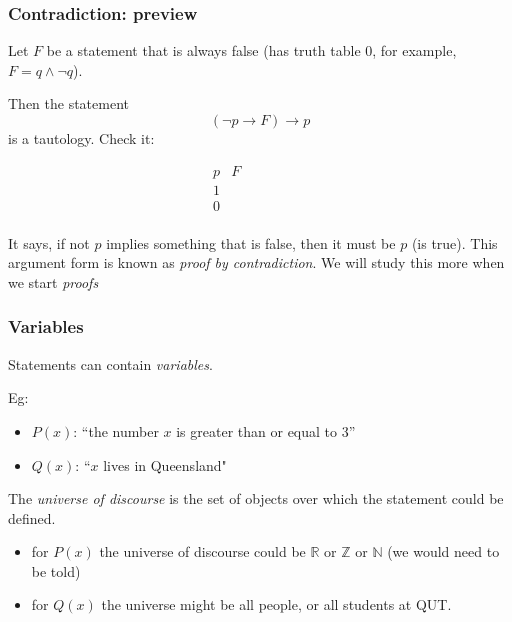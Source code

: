 \documentclass[10pt]{beamer}
\newcommand{\ra}{\to} %
\theoremstyle{definition}
\newcommand{\N}{\ensuremath{\mathbb{N}}}
\newcommand{\Z}{\ensuremath{\mathbb{Z}}}
\newcommand{\R}{\ensuremath{\mathbb{R}}}
\begin{document}
\begin{frame}
\frametitle{Contradiction: preview }
Let $F$ be a statement that is always false (has truth table 0, for example, $F=q\wedge \neg q$). 

\bigskip
Then the statement  $$(\neg p\ra F)\ra p$$ is a tautology. Check it:

\[
\begin{array}{c|c|ccc}
 p & F &   \ \ \ \ \ \ \ \ \ \ \ \ \ \ \ \ \ \ \\
 \hline
 1 & &  \\
 0&   & \\
\end{array}\]



\vspace{5mm}
\pause 
It says, if not $p$ implies something that is false, then it must be $p$ (is true). 
This  argument  form is known as {\em proof by contradiction}. We will study this more when we start {\em proofs}



\vspace{2cm}
\vfill
\end{frame}




\begin{frame}
\frametitle{Variables }

Statements can  contain {\em variables}.

\bigskip
Eg:\begin{itemize}\item 
 $P(x)$: ``the number $x$ is greater than or equal to 3'' \item 
$Q(x)$: ``$x$ lives in Queensland"\end{itemize}

\bigskip\bigskip\pause 
The {\em universe of discourse} is the set of objects over which the statement could be defined.

\bigskip
\begin{itemize}\item for $P(x)$ the universe of discourse could be $\R$ or $\Z$ or $\N$ (we would need to be told)

\bigskip \item for $Q(x)$ the universe might be all people, or all students at QUT.
\end{itemize}

\vspace{2cm}
\vfill
\end{frame}
\end{document}
